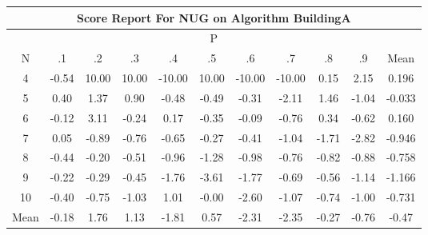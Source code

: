 \documentclass[11pt,a4paper]{report}
\begin{document}
\begin{longtable}{ | c || c | c | c | c | c | c | c | c | c || c |}
\hline
\multicolumn{11}{|c|}{ Score Report For NUG on Algorithm BuildingA} \\
\hline
\multicolumn{11}{|c|}{ P } \\
\hline
N & .1 & .2 & .3 & .4 & .5 & .6 & .7 & .8 & .9 & Mean\\
 \hline
 \hline
 \endhead
  4 &  \cellcolor[HTML]{FFEFEF} -0.54 &  \cellcolor[HTML]{0808FF} 10.00 &  \cellcolor[HTML]{0808FF} 10.00 &  \cellcolor[HTML]{FF0000} -10.00 &  \cellcolor[HTML]{0808FF} 10.00 &  \cellcolor[HTML]{FF0000} -10.00 &  \cellcolor[HTML]{FF0000} -10.00 &  \cellcolor[HTML]{FFFFFF} 0.15 &  \cellcolor[HTML]{C7C7FF} 2.15 & 0.196 \\
  5 &  \cellcolor[HTML]{F7F7FF} 0.40 &  \cellcolor[HTML]{DFDFFF} 1.37 &  \cellcolor[HTML]{E7E7FF} 0.90 &  \cellcolor[HTML]{FFEFEF} -0.48 &  \cellcolor[HTML]{FFEFEF} -0.49 &  \cellcolor[HTML]{FFF7F7} -0.31 &  \cellcolor[HTML]{FFC7C7} -2.11 &  \cellcolor[HTML]{D7D7FF} 1.46 &  \cellcolor[HTML]{FFE7E7} -1.04 & -0.033 \\
  6 &  \cellcolor[HTML]{FFFFFF} -0.12 &  \cellcolor[HTML]{AFAFFF} 3.11 &  \cellcolor[HTML]{FFF7F7} -0.24 &  \cellcolor[HTML]{F7F7FF} 0.17 &  \cellcolor[HTML]{FFF7F7} -0.35 &  \cellcolor[HTML]{FFFFFF} -0.09 &  \cellcolor[HTML]{FFEFEF} -0.76 &  \cellcolor[HTML]{F7F7FF} 0.34 &  \cellcolor[HTML]{FFEFEF} -0.62 & 0.160 \\
  7 &  \cellcolor[HTML]{FFFFFF} 0.05 &  \cellcolor[HTML]{FFE7E7} -0.89 &  \cellcolor[HTML]{FFEFEF} -0.76 &  \cellcolor[HTML]{FFEFEF} -0.65 &  \cellcolor[HTML]{FFF7F7} -0.27 &  \cellcolor[HTML]{FFF7F7} -0.41 &  \cellcolor[HTML]{FFE7E7} -1.04 &  \cellcolor[HTML]{FFD7D7} -1.71 &  \cellcolor[HTML]{FFB7B7} -2.82 & -0.946 \\
  8 &  \cellcolor[HTML]{FFF7F7} -0.44 &  \cellcolor[HTML]{FFF7F7} -0.20 &  \cellcolor[HTML]{FFEFEF} -0.51 &  \cellcolor[HTML]{FFE7E7} -0.96 &  \cellcolor[HTML]{FFDFDF} -1.28 &  \cellcolor[HTML]{FFE7E7} -0.98 &  \cellcolor[HTML]{FFEFEF} -0.76 &  \cellcolor[HTML]{FFE7E7} -0.82 &  \cellcolor[HTML]{FFE7E7} -0.88 & -0.758 \\
  9 &  \cellcolor[HTML]{FFF7F7} -0.22 &  \cellcolor[HTML]{FFF7F7} -0.29 &  \cellcolor[HTML]{FFF7F7} -0.45 &  \cellcolor[HTML]{FFCFCF} -1.76 &  \cellcolor[HTML]{FFA7A7} -3.61 &  \cellcolor[HTML]{FFCFCF} -1.77 &  \cellcolor[HTML]{FFEFEF} -0.69 &  \cellcolor[HTML]{FFEFEF} -0.56 &  \cellcolor[HTML]{FFDFDF} -1.14 & -1.166 \\
  10 &  \cellcolor[HTML]{FFF7F7} -0.40 &  \cellcolor[HTML]{FFEFEF} -0.75 &  \cellcolor[HTML]{FFE7E7} -1.03 &  \cellcolor[HTML]{E7E7FF} 1.01 &  \cellcolor[HTML]{FFFFFF} -0.00 &  \cellcolor[HTML]{FFBFBF} -2.60 &  \cellcolor[HTML]{FFE7E7} -1.07 &  \cellcolor[HTML]{FFEFEF} -0.74 &  \cellcolor[HTML]{FFE7E7} -1.00 & -0.731 \\
 \hline
 \hline
Mean &  \cellcolor[HTML]{FFF7F7} -0.18 &  \cellcolor[HTML]{CFCFFF} 1.76 &  \cellcolor[HTML]{DFDFFF} 1.13 &  \cellcolor[HTML]{FFCFCF} -1.81 &  \cellcolor[HTML]{EFEFFF} 0.57 &  \cellcolor[HTML]{FFC7C7} -2.31 &  \cellcolor[HTML]{FFC7C7} -2.35 &  \cellcolor[HTML]{FFF7F7} -0.27 &  \cellcolor[HTML]{FFEFEF} -0.76 &  \cellcolor[HTML]{FFF7F7} -0.47
\end{longtable}
\end{document}
